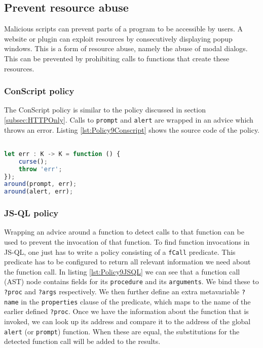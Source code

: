 \subsection{Prevent resource abuse}
Malicious scripts can prevent parts of a program to be accessible by users. A website or plugin can exploit resources by consecutively displaying popup windows. This is a form of resource abuse, namely the abuse of modal dialogs. This can be prevented by prohibiting calls to functions that create these resources. 

\subsubsection*{ConScript policy}

The ConScript policy is similar to the policy discussed in section \ref{subsec:HTTPOnly}. Calls to \texttt{prompt} and \texttt{alert} are wrapped in an advice which throws an error. Listing \ref{lst:Policy9Conscript} shows the source code of the policy.

\begin{lstlisting}[label={lst:Policy9Conscript},language=JavaScript,caption=Policy 9 in ConScript,mathescape=true]  % float=t?

let err : K -> K = function () { 
    curse(); 
    throw 'err'; 
}); 
around(prompt, err); 
around(alert, err);
\end{lstlisting}


\subsubsection*{JS-QL policy}

Wrapping an advice around a function to detect calls to that function can be used to prevent the invocation of that function. To find function invocations in JS-QL, one just has to write a policy consisting of a \texttt{fCall} predicate. This predicate has to be configured to return all relevant information we need about the function call. In listing \ref{lst:Policy9JSQL} we can see that a function call (AST) node contains fields for its \texttt{procedure} and its \texttt{arguments}. We bind these to \texttt{?proc} and \texttt{?args} respectively. We then further define an extra metavariable \texttt{?name} in the \texttt{properties} clause of the predicate, which maps to the name of the earlier defined \texttt{?proc}. Once we have the information about the function that is invoked, we can look up its address and compare it to the address of the global \texttt{alert} (or \texttt{prompt}) function. When these are equal, the substitutions for the detected function call will be added to the results.

